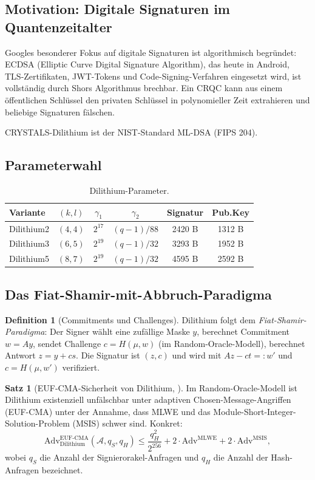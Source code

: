 ﻿\documentclass[a4paper,12pt]{article}
\theoremstyle{definition}
\newtheorem{definition}{Definition}[section]
\newtheorem{satz}{Satz}[section]
\begin{document}
\subsection{Motivation: Digitale Signaturen im Quantenzeitalter}

Googles besonderer Fokus auf digitale Signaturen ist algorithmisch begründet:
ECDSA (Elliptic Curve Digital Signature Algorithm), das heute in Android,
TLS-Zertifikaten, JWT-Tokens und Code-Signing-Verfahren eingesetzt wird,
ist vollständig durch Shors Algorithmus brechbar. Ein CRQC kann aus einem
öffentlichen Schlüssel den privaten Schlüssel in polynomieller Zeit extrahieren
und beliebige Signaturen fälschen.

CRYSTALS-Dilithium \cite{DKL+22} ist der NIST-Standard ML-DSA (FIPS 204).

\subsection{Parameterwahl}

\begin{table}[H]
\centering
\caption{Dilithium-Parameter.}
\label{tab:dilithium}
\begin{tabular}{lccccc}
\toprule
Variante & $(k, l)$ & $\gamma_1$ & $\gamma_2$ & Signatur & Pub.Key\\
\midrule
Dilithium2 & $(4,4)$ & $2^{17}$ & $(q-1)/88$ & 2420 B & 1312 B\\
Dilithium3 & $(6,5)$ & $2^{19}$ & $(q-1)/32$ & 3293 B & 1952 B\\
Dilithium5 & $(8,7)$ & $2^{19}$ & $(q-1)/32$ & 4595 B & 2592 B\\
\bottomrule
\end{tabular}
\end{table}

\subsection{Das Fiat-Shamir-mit-Abbruch-Paradigma}

\begin{definition}[Commitments und Challenges]
Dilithium folgt dem \emph{Fiat-Shamir-Para\-digma}:
Der Signer wählt eine zufällige Maske $y$, berechnet
Commitment $w = Ay$, sendet Challenge $c = H(\mu, w)$ (im Random-Oracle-Modell),
berechnet Antwort $z = y + cs$. Die Signatur ist $(z, c)$ und wird mit
$Az - ct =: w'$ und $c = H(\mu, w')$ verifiziert.
\end{definition}

\begin{satz}[EUF-CMA-Sicherheit von Dilithium, \cite{DKL+22}]
Im Random-Oracle-Modell ist Dilithium existenziell unfälschbar unter
adaptiven Chosen-Message-Angriffen (EUF-CMA) unter der Annahme,
dass MLWE und das Module-Short-Integer-Solution-Problem (MSIS) schwer sind.
Konkret:
\[
  \mathrm{Adv}^{\mathrm{EUF\text{-}CMA}}_{\mathrm{Dilithium}}(\mathcal{A}, q_S, q_H)
  \leq \frac{q_H^2}{2^{256}} + 2 \cdot \mathrm{Adv}^{\mathrm{MLWE}} + 2 \cdot \mathrm{Adv}^{\mathrm{MSIS}},
\]
wobei $q_S$ die Anzahl der Signierorakel-Anfragen und $q_H$ die
Anzahl der Hash-Anfragen bezeichnet.
\end{satz}
\end{document}

